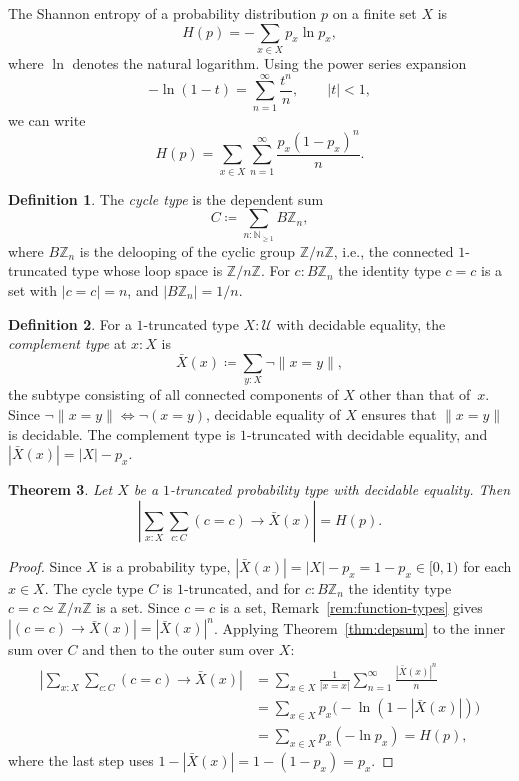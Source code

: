 \documentclass[12pt]{amsart}
\newcommand{\U}{\mathcal{U}}
\newcommand{\N}{\mathbb{N}}
\newcommand{\BZ}{B\mathbb{Z}}
\theoremstyle{plain}
\newtheorem{theorem}{Theorem}[section]
\theoremstyle{definition}
\newtheorem{definition}[theorem]{Definition}
\theoremstyle{remark}
\begin{document}
The Shannon entropy of a probability distribution $p$ on a finite set $X$ is
\[
H(p)=-\sum_{x\in X}p_x\ln p_x,
\]
where $\ln$ denotes the natural logarithm. Using the power series expansion
\[
-\ln(1-t) = \sum_{n=1}^{\infty}\frac{t^n}{n}, \qquad |t|<1,
\]
we can write
\begin{equation}\label{eq:entropy-series}
H(p) = \sum_{x\in X}\sum_{n=1}^{\infty}\frac{p_x(1-p_x)^n}{n}.
\end{equation}

\begin{definition}\label{def:cycle-type}
The \emph{cycle type} is the dependent sum
\[
C \coloneqq \sum_{n:\N_{\geq 1}}\BZ_n,
\]
where $\BZ_n$ is the delooping of the cyclic group $\mathbb{Z}/n\mathbb{Z}$, i.e., the connected $1$-truncated type whose loop space is $\mathbb{Z}/n\mathbb{Z}$. For $c:\BZ_n$ the identity type $c=c$ is a set with $|c=c|=n$, and $|\BZ_n|=1/n$.
\end{definition}

\begin{definition}\label{def:complement}
For a $1$-truncated type $X:\U$ with decidable equality, the \emph{complement type} at $x:X$ is
\[
\bar{X}(x) \coloneqq \sum_{y:X}\neg\|x=y\|,
\]
the subtype consisting of all connected components of $X$ other than that of~$x$. Since $\neg\|x=y\|\Leftrightarrow\neg(x=y)$, decidable equality of $X$ ensures that $\|x=y\|$ is decidable. The complement type is $1$-truncated with decidable equality, and $|\bar{X}(x)| = |X|-p_x$.
\end{definition}

\begin{theorem}\label{thm:entropy}
Let $X$ be a $1$-truncated probability type with decidable equality. Then
\[
\left|\sum_{x:X}\sum_{c:C}(c=c)\to \bar{X}(x)\right| = H(p).
\]
\end{theorem}

\begin{proof}
Since $X$ is a probability type, $|\bar{X}(x)| = |X|-p_x = 1-p_x \in [0,1)$ for each $x\in X$. The cycle type $C$ is $1$-truncated, and for $c:\BZ_n$ the identity type $c=c\simeq\mathbb{Z}/n\mathbb{Z}$ is a set. Since $c=c$ is a set, Remark~\ref{rem:function-types} gives $|(c=c)\to \bar{X}(x)| = |\bar{X}(x)|^n$. Applying Theorem~\ref{thm:depsum} to the inner sum over $C$ and then to the outer sum over $X$:
\begin{align*}
\left|\sum_{x:X}\sum_{c:C}(c=c)\to \bar{X}(x)\right|
&= \sum_{x\in X}\frac{1}{|x=x|}\sum_{n=1}^{\infty}\frac{|\bar{X}(x)|^n}{n}\\[4pt]
&= \sum_{x\in X}p_x\bigl(-\ln(1-|\bar{X}(x)|)\bigr)\\[4pt]
&= \sum_{x\in X}p_x(-\ln p_x) = H(p),
\end{align*}
where the last step uses $1-|\bar{X}(x)|=1-(1-p_x)=p_x$.
\end{proof}
\end{document}
